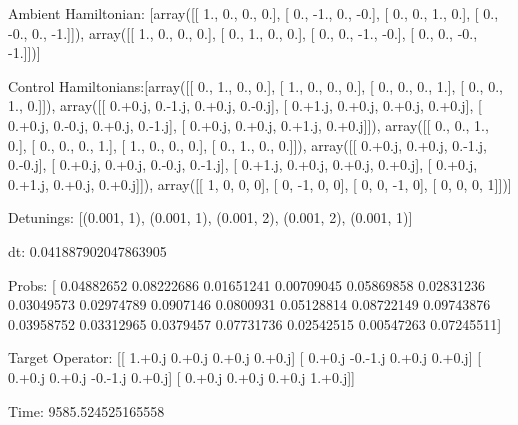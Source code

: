 \documentclass{article}
\begin{document}
    

\newpage

Ambient Hamiltonian: [array([[ 1.,  0.,  0.,  0.],
       [ 0., -1.,  0., -0.],
       [ 0.,  0.,  1.,  0.],
       [ 0., -0.,  0., -1.]]), array([[ 1.,  0.,  0.,  0.],
       [ 0.,  1.,  0.,  0.],
       [ 0.,  0., -1., -0.],
       [ 0.,  0., -0., -1.]])]

Control Hamiltonians:[array([[ 0.,  1.,  0.,  0.],
       [ 1.,  0.,  0.,  0.],
       [ 0.,  0.,  0.,  1.],
       [ 0.,  0.,  1.,  0.]]), array([[ 0.+0.j,  0.-1.j,  0.+0.j,  0.-0.j],
       [ 0.+1.j,  0.+0.j,  0.+0.j,  0.+0.j],
       [ 0.+0.j,  0.-0.j,  0.+0.j,  0.-1.j],
       [ 0.+0.j,  0.+0.j,  0.+1.j,  0.+0.j]]), array([[ 0.,  0.,  1.,  0.],
       [ 0.,  0.,  0.,  1.],
       [ 1.,  0.,  0.,  0.],
       [ 0.,  1.,  0.,  0.]]), array([[ 0.+0.j,  0.+0.j,  0.-1.j,  0.-0.j],
       [ 0.+0.j,  0.+0.j,  0.-0.j,  0.-1.j],
       [ 0.+1.j,  0.+0.j,  0.+0.j,  0.+0.j],
       [ 0.+0.j,  0.+1.j,  0.+0.j,  0.+0.j]]), array([[ 1,  0,  0,  0],
       [ 0, -1,  0,  0],
       [ 0,  0, -1,  0],
       [ 0,  0,  0,  1]])]

Detunings: [(0.001, 1), (0.001, 1), (0.001, 2), (0.001, 2), (0.001, 1)]

 dt: 0.041887902047863905

Probs: [ 0.04882652  0.08222686  0.01651241  0.00709045  0.05869858  0.02831236
  0.03049573  0.02974789  0.0907146   0.0800931   0.05128814  0.08722149
  0.09743876  0.03958752  0.03312965  0.0379457   0.07731736  0.02542515
  0.00547263  0.07245511]

Target Operator: [[ 1.+0.j  0.+0.j  0.+0.j  0.+0.j]
 [ 0.+0.j -0.-1.j  0.+0.j  0.+0.j]
 [ 0.+0.j  0.+0.j -0.-1.j  0.+0.j]
 [ 0.+0.j  0.+0.j  0.+0.j  1.+0.j]]

Time: 9585.524525165558
\end{document}
